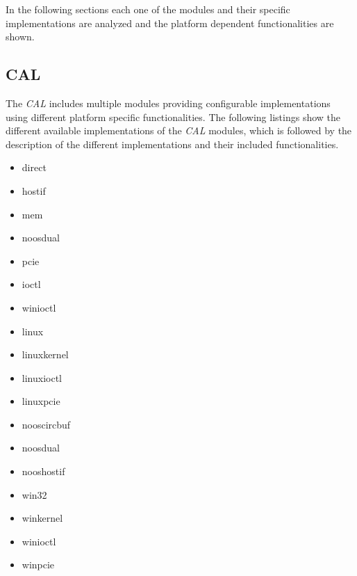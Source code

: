 In the following sections each one of the modules and their specific implementations are analyzed and the platform dependent functionalities are shown.

\subsection{CAL}
\label{sec:oplk_platform_cal}

The \emph{CAL} includes multiple modules providing configurable implementations using different platform specific functionalities.
The following listings show the different available implementations of the \emph{CAL} modules, which is followed by the description of the different implementations and their included functionalities.
\\
    
\begin{description}[leftmargin=0cm]
    \item[control module] \mbox{}
    \begin{multicols}{3}
        \begin{itemize}
            \item direct
            \item hostif
            \item mem
            \item noosdual
            \item pcie
            \item ioctl
            \item winioctl
        \end{itemize}
    \end{multicols}
    
    \item[event handler] \mbox{}
    \begin{multicols}{3}
        \begin{itemize}
            \item linux
            \item linuxkernel
            \item linuxioctl
            \item linuxpcie
            \item nooscircbuf
            \item noosdual
            \item nooshostif
            \item win32
            \item winkernel
            \item winioctl
            \item winpcie
        \end{itemize}
    \end{multicols}
    

\end{description}
